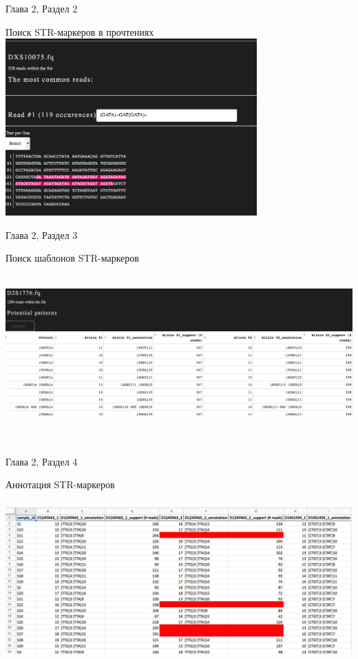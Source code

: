 \documentclass[8pt]{beamer}
\begin{document}
\begin{frame}{Глава 2, Раздел 2}
    \begin{block}{Поиск STR-маркеров в прочтениях}
        \includegraphics[height=6.8cm]{images/str_search.png}
        \centering
    \end{block}
\end{frame}

\begin{frame}{Глава 2, Раздел 3}
    \begin{block}{Поиск шаблонов STR-маркеров}
        \includegraphics[height=6.8cm]{images/str_pat_search.png}
        \centering
    \end{block}
\end{frame}

\begin{frame}{Глава 2, Раздел 4}
    \begin{block}{Аннотация STR-маркеров}
        \includegraphics[height=6.8cm]{images/ann.png}
        \centering
    \end{block}
\end{frame}
\end{document}
